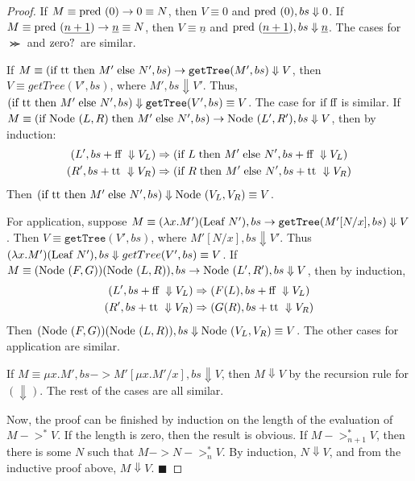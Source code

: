 \begin{proof}
If $M\equiv \textrm{pred } (0) -> 0 \equiv N$, then $V\equiv 0$ and $\textrm{pred }(0), bs \Downarrow 0$.  If $M\equiv \textrm{pred } (\underline{n+1}) -> \underline{n} \equiv N$, then $V\equiv \underline{n}$ and $\textrm{pred }(\underline{n+1}), bs \Downarrow \underline{n}$.
The cases for $\Succ\!\!$ and $\textrm{zero? }\!\!$ are similar.

If $M\equiv (\textrm{if } \textrm{tt } \textrm{then } M'\;\textrm{else } N', bs) -> \texttt{getTree}(M', bs) \Downarrow V$, then $V\equiv getTree(V', bs)$, where $M', bs\Downarrow V'$.  Thus, $(\textrm{if } \textrm{tt } \textrm{then } M'\;\textrm{else } N', bs) \Downarrow \texttt{getTree}(V', bs) \equiv V$.  The case for $\textrm{if } \textrm{ff }\!\!$ is similar.  If $M\equiv (\textrm{if } \textrm{Node }(L,R)\; \textrm{then } M'\;\textrm{else } N', bs) -> \textrm{Node }(L',R'), bs \Downarrow V$, then by induction: \begin{align*}
(L', bs+\textrm{ff } \Downarrow V_L) &\Rightarrow (\textrm{if } L \;\textrm{then } M'\; \textrm{else } N',bs+\textrm{ff } \Downarrow V_L) \\
(R', bs+\textrm{tt } \Downarrow V_R) &\Rightarrow (\textrm{if } R \;\textrm{then } M'\; \textrm{else } N',bs+\textrm{tt } \Downarrow V_R)
\end{align*}
 Then $(\textrm{if } \textrm{tt } \textrm{then } M'\;\textrm{else } N', bs) \Downarrow \textrm{Node }(V_L, V_R) \equiv V$.

For application, suppose $M\equiv (\lambda x.M')(\textrm{Leaf } N'), bs -> \texttt{getTree}(M'[N/x], bs) \Downarrow V$.  Then ${V\equiv \texttt{getTree}(V', bs)}$, where $M'[N/x], bs \Downarrow V'$.  Thus $(\lambda x.M')(\textrm{Leaf } N'), bs \Downarrow getTree(V',bs) \equiv V$.  If $M\equiv (\textrm{Node }(F,G))(\textrm{Node }(L,R)), bs -> \textrm{Node }(L',R'), bs \Downarrow V$, then by induction,
\begin{align*}
(L',bs+\textrm{ff } \Downarrow V_L) &\Rightarrow (F(L),bs+\textrm{ff } \Downarrow V_L) \\
(R',bs+\textrm{tt } \Downarrow V_R) &\Rightarrow (G(R),bs+\textrm{tt } \Downarrow V_R)
\end{align*}
Then $(\textrm{Node }(F,G))(\textrm{Node }(L,R)), bs \Downarrow \textrm{Node }(V_L, V_R) \equiv V$.  The other cases for application are similar.

If $M\equiv \mu x.M', bs -> M'[\mu x.M'/x], bs \Downarrow V$, then $M \Downarrow V$ by the recursion rule for $(\Downarrow)$.  The rest of the cases are all similar.

Now, the proof can be finished by induction on the length of the evaluation of $M->^{*} V$.  If the length is zero, then the result is obvious.  If $M->^{*}_{n+1} V$, then there is some $N$ such that $M-> N ->^{*}_{n} V$.  By induction, $N\Downarrow V$, and from the inductive proof above, $M\Downarrow V$.
\hfill $\blacksquare$
\end{proof}

